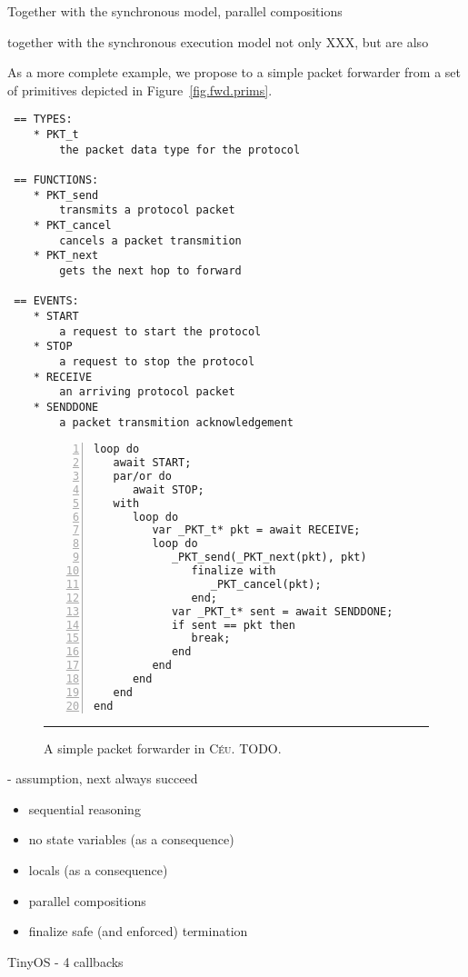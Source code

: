 \documentclass{sig-alternate-ipsn13}
\newcommand{\CEU}{\textsc{C\'{e}u}\xspace}
\begin{document}
%
Together with the synchronous model, parallel compositions

together with the synchronous execution model not only XXX, but are also

As a more complete example, we propose to a simple packet forwarder from a set 
of primitives depicted in Figure~\ref{fig.fwd.prims}.

\begin{lstlisting}
 == TYPES:
    * PKT_t
        the packet data type for the protocol

 == FUNCTIONS:
    * PKT_send
        transmits a protocol packet
    * PKT_cancel
        cancels a packet transmition
    * PKT_next
        gets the next hop to forward

 == EVENTS:
    * START
        a request to start the protocol
    * STOP
        a request to stop the protocol
    * RECEIVE
        an arriving protocol packet
    * SENDDONE
        a packet transmition acknowledgement
\end{lstlisting}

\begin{figure}[h]
\begin{lstlisting}[numbers=left,xleftmargin=3em]
loop do
   await START;
   par/or do
      await STOP;
   with
      loop do
         var _PKT_t* pkt = await RECEIVE;
         loop do
            _PKT_send(_PKT_next(pkt), pkt)
               finalize with
                  _PKT_cancel(pkt);
               end;
            var _PKT_t* sent = await SENDDONE;
            if sent == pkt then
               break;
            end
         end
      end
   end
end
\end{lstlisting}
\rule{8.6cm}{0.37pt}
\caption{ A simple packet forwarder in \CEU.\newline
{\small %
TODO.
}%
\label{lst.TODO}
}
\end{figure}

- assumption, next always succeed

\begin{itemize}
\item sequential reasoning
\item no state variables (as a consequence)
\item locals (as a consequence)
\item parallel compositions
\item finalize safe (and enforced) termination
\end{itemize}

TinyOS
- 4 callbacks
\end{document}
